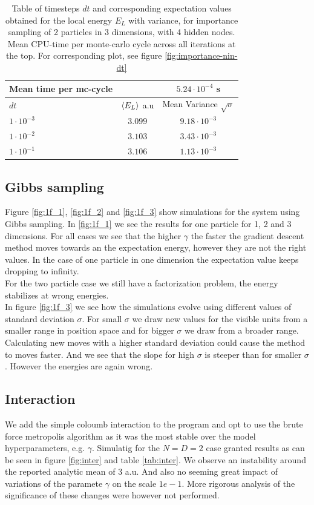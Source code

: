 \begin{table}[h]
\begin{tabular}{l c c}
	Mean time per mc-cycle & & $5.24\cdot10^{-4}$ s \\
	\hline
	$dt$ & $\langle E_L \rangle$ a.u & Mean Variance $\sqrt{\sigma}$\\
	\hline
	$1\cdot10^{-3}$ & $3.099$ & $9.18\cdot10^{-3}$ \\
	$1\cdot10^{-2}$ & $3.103$ & $3.43\cdot10^{-3}$ \\
	$1\cdot10^{-1}$ & $3.106$ & $1.13\cdot10^{-3}$ \\
\end{tabular}
\label{tab:importance-nin-dt}
\caption{Table of timesteps $dt$ and corresponding expectation values obtained for the local energy $E_L$ with variance, for importance sampling
		of 2 particles in 3 dimensions, with 4 hidden nodes.
		Mean CPU-time per monte-carlo cycle across all iterations at the top.
	For corresponding plot, see figure \ref{fig:importance-nin-dt}}
\end{table}


\subsection{Gibbs sampling}
Figure \ref{fig:1f_1}, \ref{fig:1f_2} and \ref{fig:1f_3} show simulations for the system using Gibbs sampling. In \ref{fig:1f_1} we see the results for one particle for 1, 2 and 3 dimensions. For all cases we see that the higher $\gamma$ the faster the gradient descent method moves towards an the expectation energy, however they are not the right values. In the case of one particle in one dimension the expectation value keeps dropping to infinity. \\
For the two particle case we still have a factorization problem, the energy stabilizes at wrong energies.\\
In figure \ref{fig:1f_3} we see how the simulations evolve using different values of standard deviation $\sigma$. For small $\sigma$ we draw new values for the visible units from a smaller range in position space and for bigger $\sigma$ we draw from a broader range. Calculating new moves with a higher standard deviation could cause the method to moves faster. And we see that the slope for high $\sigma$ is steeper than for smaller $\sigma$. However the energies are again wrong.


\subsection{Interaction}
We add the simple coloumb interaction to the program and opt to use the brute force metropolis algorithm as it was the most stable over the model hyperparameters, e.g. $\gamma$. Simulatig for the $N = D = 2$ case granted results as can be seen in figure \ref{fig:inter} and table \ref{tab:inter}. We observe an instability around the reported analytic mean of 3 a.u. And also no seeming great impact of variations of the paramete $\gamma$ on the scale $1e-1$. More rigorous analysis of the significance of these changes were however not performed. 

